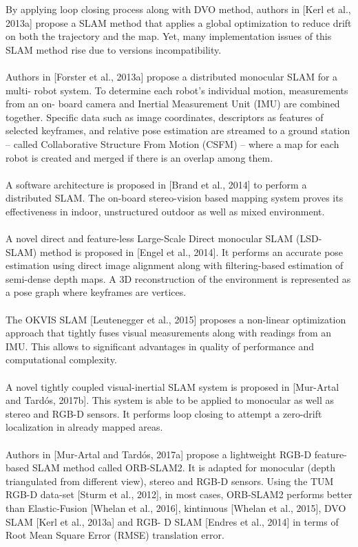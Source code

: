 \documentclass[11pt,openany]{book}
\begin{document}
By applying loop closing process along with DVO method, authors in [Kerl et al., 2013a] propose a SLAM method that applies a global optimization to reduce drift on both the trajectory and the map. Yet, many implementation issues of this SLAM method rise due to versions incompatibility.\\\\
Authors in [Forster et al., 2013a] propose a distributed monocular SLAM for a multi- robot system. To determine each robot’s individual motion, measurements from an on- board camera and Inertial Measurement Unit (IMU) are combined together. Speciﬁc data such as image coordinates, descriptors as features of selected keyframes, and relative pose estimation are streamed to a ground station – called Collaborative Structure From Motion (CSFM) – where a map for each robot is created and merged if there is an overlap among them.\\\\
A software architecture is proposed in [Brand et al., 2014] to perform a distributed SLAM. The on-board stereo-vision based mapping system proves its eﬀectiveness in indoor, unstructured outdoor as well as mixed environment.\\\\
A novel direct and feature-less Large-Scale Direct monocular SLAM (LSD-SLAM) method is proposed in [Engel et al., 2014]. It performs an accurate pose estimation using direct image alignment along with ﬁltering-based estimation of semi-dense depth maps. A 3D reconstruction of the environment is represented as a pose graph where keyframes are vertices.\\\\
The OKVIS SLAM [Leutenegger et al., 2015] proposes a non-linear optimization approach that tightly fuses visual measurements along with readings from an IMU. This allows to signiﬁcant advantages in quality of performance and computational complexity.\\\\
A novel tightly coupled visual-inertial SLAM system is proposed in [Mur-Artal and Tardós, 2017b]. This system is able to be applied to monocular as well as stereo and RGB-D sensors. It performs loop closing to attempt a zero-drift localization in already mapped areas.\\\\
Authors in [Mur-Artal and Tardós, 2017a] propose a lightweight RGB-D feature-based SLAM method called ORB-SLAM2. It is adapted for monocular (depth triangulated from diﬀerent view), stereo and RGB-D sensors. Using the TUM RGB-D data-set [Sturm et al., 2012], in most cases, ORB-SLAM2 performs better than Elastic-Fusion [Whelan et al., 2016], kintinuous [Whelan et al., 2015], DVO SLAM [Kerl et al., 2013a] and RGB- D SLAM [Endres et al., 2014] in terms of Root Mean Square Error (RMSE) translation error.\\\\
\end{document}
